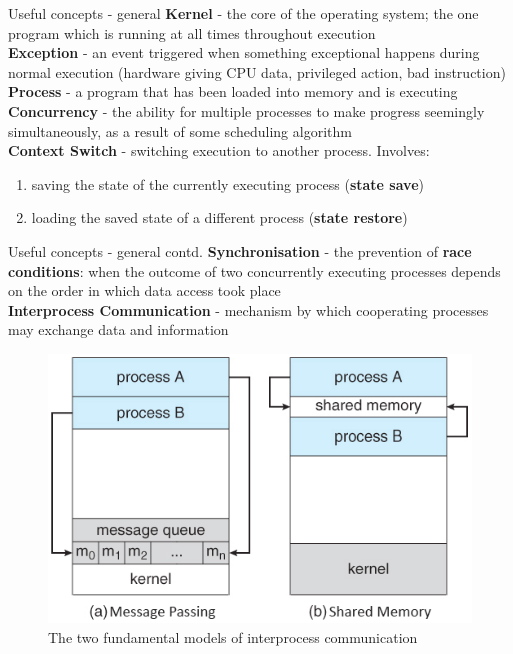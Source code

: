 \documentclass[10pt]{beamer}
\begin{document}
\begin{frame}{Useful concepts - general}
    \textbf{Kernel} - the core of the operating system; the one program which is
    running at all times throughout execution \\

    \textbf{Exception} - an event triggered when something exceptional happens
    during normal execution (hardware giving CPU data, privileged action, bad
    instruction) \\

    \textbf{Process} - a program that has been loaded into memory and is
    executing \\

    \textbf{Concurrency} - the ability for multiple processes to make progress
    seemingly simultaneously, as a result of some scheduling algorithm \\

    \textbf{Context Switch} - switching execution to another process. Involves:
    \begin{enumerate}
        \item saving the state of the currently executing process (\textbf{state
            save})
        \item loading the saved state of a different process (\textbf{state
            restore})
    \end{enumerate}
\end{frame}

\begin{frame}{Useful concepts - general contd.}
    \textbf{Synchronisation} - the prevention of \textbf{race conditions}: when
    the outcome of two concurrently executing processes depends on the order in
    which data access took place \\

    \textbf{Interprocess Communication} - mechanism by which cooperating
    processes may exchange data and information

    \begin{figure}[h]
        \includegraphics[width=.5\textwidth]{ipc.png}
        \caption{The two fundamental models of interprocess communication}
    \end{figure}
\end{frame}
\end{document}
